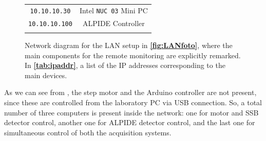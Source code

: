 \documentclass[../../main/main.tex]{subfiles}
\begin{document}
\begin{figure}[h]
\begin{minipage}[c]{0.49\linewidth}
{{\begin{tabular}{cc}
                    \texttt{10.10.10.30}   &   Intel \texttt{NUC 03} Mini PC    \\
                    \texttt{10.10.10.100}  &   ALPIDE Controller      \\
                    \botrule
                \end{tabular}
                \label{tab:ipaddr}
            }
        }
    \end{minipage}
    \caption{Network diagram for the LAN setup in \textbf{\ref{fig:LANfoto}}, where the main components for the remote monitoring are explicitly remarked. In \textbf{\ref{tab:ipaddr}}, a list of the IP addresses corresponding to the main devices.}
    \label{figtab:LAN}
\end{figure}

As we can see from , the step motor and the Arduino controller are not present, since these are controlled from the laboratory PC via USB connection. So, a total number of three computers is present inside the network: one for motor and SSB detector control, another one for ALPIDE detector control, and the last one for simultaneous control of both the acquisition systems.
\end{document}
